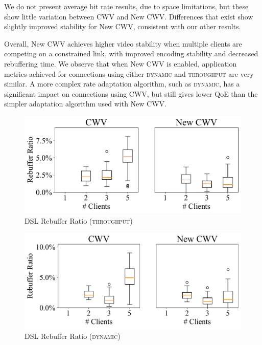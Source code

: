 \documentclass[10pt, acmlarge]{acmart}
\begin{document}
We do not present average bit rate results, due to space limitations, 
but these show little variation between CWV and New CWV. Differences that exist show 
slightly improved stability for New CWV, consistent with our other results.


Overall, New CWV achieves higher video stability when multiple clients are competing on 
a constrained link, with improved encoding stability and decreased rebuffering time. 
We observe that when New CWV is enabled, application metrics achieved for connections 
using either \textsc{dynamic} and \textsc{throughput} are very similar. A more complex 
rate adaptation algorithm, such as \textsc{dynamic}, has a significant impact on 
connections using CWV, but still gives lower QoE than the simpler adaptation algorithm
used with New CWV.

\begin{figure}
    \includegraphics[width=\textwidth, keepaspectratio]{figures/Rebuffer_Ratio_throughput.pdf}
    \caption{DSL Rebuffer Ratio (\textsc{throughput})}
    \label{fig:rebuffer-ratio}
\end{figure}

\begin{figure}
    \includegraphics[width=\textwidth, keepaspectratio]{figures/Rebuffer_Ratio_dynamic.pdf}
    \caption{DSL Rebuffer Ratio (\textsc{dynamic})}
    \label{fig:rebuffer-ratio-dynamic}
\end{figure}
\end{document}
